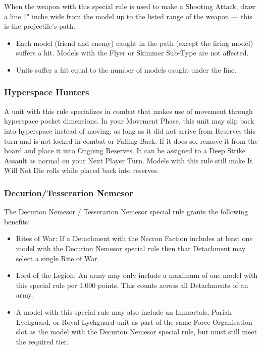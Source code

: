 \begin{multicols}{2}
When the weapon with this special rule is used to make a Shooting Attack, draw a line 1" inche wide from the model up to the listed range of the weapon — this is the projectile's path.

\begin{itemize}
	\item Each model (friend and enemy) caught in the path (except the firing model) suffers a hit. Models with the Flyer or Skimmer Sub-Type are not affected.
	\item Units suffer a hit equal to the number of models caught under the line.
\end{itemize}

\subsubsection{Hyperspace Hunters} \label{Hyperspace Hunters}

A unit with this rule specializes in combat that makes use of movement through hyperspace pocket dimensions. In your Movement Phase, this unit may slip back into hyperspace instead of moving, as long as it did not arrive from Reserves this turn and is not locked in combat or Falling Back. If it does so, remove it from the board and place it into Ongoing Reserves. It can be assigned to a Deep Strike Assault as normal on your Next Player Turn. Models with this rule still make It Will Not Die rolls while placed back into reserves.

\subsubsection{Decurion/Tesserarion Nemesor} \label{Decurion Nemesor} \label{Tesserarion Nemesor}

The Decurion Nemesor / Tesserarion Nemesor special rule grants the following benefits:

\begin{itemize}
	\itemsep 0pt
	\item Rites of War: If a Detachment with the Necron Faction includes at least one model with the Decurion Nemesor special rule then that Detachment may select a single Rite of War. 
	\item Lord of the Legion: An army may only include a maximum of one model with this special rule per 1,000 points. This counts across all Detachments of an army.
	\item A model with this special rule may also include an Immortals, Pariah Lychguard, or Royal Lychguard unit as part of the same Force Organisation slot as the model with the Decurion Nemesor special rule, but must still meet the required  tier.
\end{itemize}


\end{multicols}
